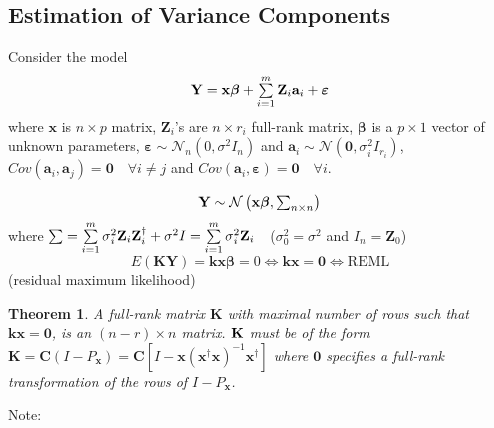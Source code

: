 \documentclass{article}
\newtheorem{theorem}{Theorem}
\begin{document}
\bigskip 

\subsection{Estimation of Variance Components}

Consider the model%
\begin{equation*}
\mathbf{Y}=\mathbf{x\beta }+\tsum\limits_{i=1}^{m}\mathbf{Z}_{i}\mathbf{a}%
_{i}+\mathbf{\varepsilon }
\end{equation*}%
where $\mathbf{x}$ is $n\times p$ matrix, $\mathbf{Z}_{i}$'s are $n\times
r_{i}$ full-rank matrix, $\mathbf{\beta }$ is a $p\times 1$ vector of
unknown parameters, $\mathbf{\varepsilon \sim }\mathcal{N}_{n}\left(
0,\sigma ^{2}I_{n}\right) $ and $\mathbf{a}_{i}\sim \mathcal{N}\left( 
\mathbf{0},\sigma _{i}^{2}I_{r_{i}}\right) $, $Cov\left( \mathbf{a}_{i},%
\mathbf{a}_{j}\right) =\mathbf{0}\quad \forall i\neq j$ and $Cov\left( 
\mathbf{a}_{i},\mathbf{\varepsilon }\right) =\mathbf{0}\quad \forall i$.

\bigskip 

\begin{equation*}
\therefore \mathbf{Y}\sim \mathcal{N}\left( \mathbf{x\beta }%
,\tsum\nolimits_{n\times n}\right) 
\end{equation*}%
where $\tsum =\tsum\limits_{i=1}^{m}\sigma _{i}^{2}\mathbf{Z}_{i}\mathbf{Z}%
_{i}^{\dagger }+\sigma ^{2}I=\tsum\limits_{i=1}^{m}\sigma _{i}^{2}\mathbf{Z}%
_{i}\quad $($\sigma _{0}^{2}=\sigma ^{2}$ and $I_{n}=\mathbf{Z}_{0}$)%
\begin{equation*}
E\left( \mathbf{KY}\right) =\mathbf{kx\beta }=0\Leftrightarrow \mathbf{kx}=%
\mathbf{0}\Leftrightarrow \text{REML}
\end{equation*}%
(residual maximum likelihood)

\bigskip 

\begin{theorem}
A full-rank matrix $\mathbf{K}$ with maximal number of rows such that $%
\mathbf{kx}=\mathbf{0}$, is an $\left( n-r\right) \times n$ matrix. $\mathbf{%
K}$ must be of the form $\mathbf{K}=\mathbf{C}\left( I-P_{\mathbf{x}}\right)
=\mathbf{C}\left[ I-\mathbf{x}\left( \mathbf{x}^{\dagger }\mathbf{x}\right)
^{-1}\mathbf{x}^{\dagger }\right] $ where $\mathbf{0}$ specifies a full-rank
transformation of the rows of $I-P_{\mathbf{x}}$.
\end{theorem}

\bigskip 

Note:
\end{document}

